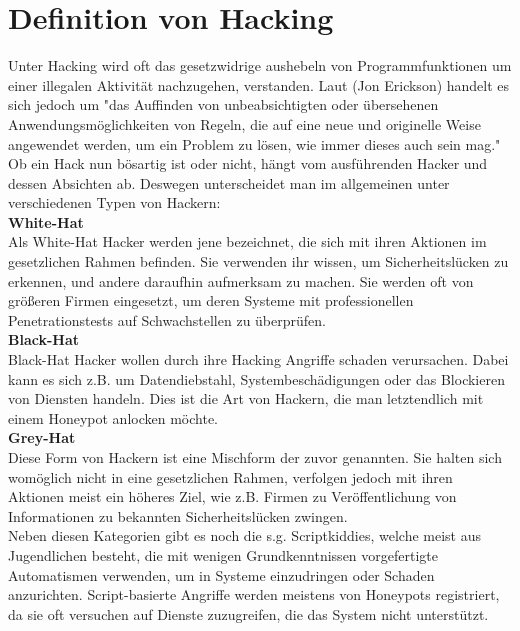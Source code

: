 \section{Definition von Hacking}
Unter Hacking wird oft das gesetzwidrige aushebeln von Programmfunktionen um einer illegalen Aktivität nachzugehen, verstanden. Laut (Jon Erickson) handelt es sich jedoch um "das Auffinden von unbeabsichtigten oder übersehenen Anwendungsmöglichkeiten von Regeln, die auf eine neue und originelle Weise angewendet werden, um ein Problem zu lösen, wie immer dieses auch sein mag." 
Ob ein Hack nun bösartig ist oder nicht, hängt vom ausführenden Hacker und dessen Absichten ab. Deswegen unterscheidet man im allgemeinen unter verschiedenen Typen von Hackern:\\

\noindent\textbf{White-Hat}\\
Als White-Hat Hacker werden jene bezeichnet, die sich mit ihren Aktionen im gesetzlichen Rahmen befinden. Sie verwenden ihr wissen, um Sicherheitslücken zu erkennen, und andere daraufhin aufmerksam zu machen. Sie werden oft von größeren Firmen eingesetzt, um deren Systeme mit professionellen Penetrationstests auf Schwachstellen zu überprüfen. \\

\noindent\textbf{Black-Hat}\\
Black-Hat Hacker wollen durch ihre Hacking Angriffe schaden verursachen. Dabei kann es sich z.B. um Datendiebstahl, Systembeschädigungen oder das Blockieren von Diensten handeln. Dies ist die Art von Hackern, die man letztendlich mit einem Honeypot anlocken möchte.\\

\noindent\textbf{Grey-Hat}\\
Diese Form von Hackern ist eine Mischform der zuvor genannten. Sie halten sich womöglich nicht in eine gesetzlichen Rahmen, verfolgen jedoch mit ihren Aktionen meist ein höheres Ziel, wie z.B. Firmen zu Veröffentlichung von Informationen zu bekannten Sicherheitslücken zwingen.\\

Neben diesen Kategorien gibt es noch die s.g. Scriptkiddies, welche meist aus Jugendlichen besteht, die mit wenigen Grundkenntnissen vorgefertigte Automatismen verwenden, um in Systeme einzudringen oder Schaden anzurichten. Script-basierte Angriffe werden meistens von Honeypots registriert, da sie oft versuchen auf Dienste zuzugreifen, die das System nicht unterstützt.